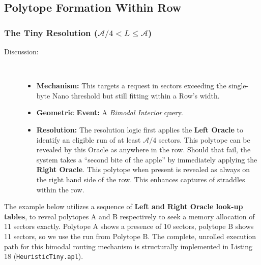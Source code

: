 \documentclass[11pt]{article}
\begin{document}
\subsection{Polytope Formation Within Row}

\subsubsection{The Tiny Resolution ($\mathcal{A}/4 < L \le \mathcal{A}$)}

\begin{description}
\item[Discussion:] \hfill \\
\begin{itemize}
    \item \textbf{Mechanism:} This targets a request in sectors exceeding the single-byte Nano threshold but still fitting within a Row's width.
    
    \item \textbf{Geometric Event:} A \textit{Bimodal Interior} query.
    
    \item \textbf{Resolution:} The resolution logic first applies the \textbf{Left Oracle} to identify an eligible run of at least  $\mathcal{A}/4$ sectors. This polytope can be revealed by this Oracle as anywhere in the row. Should that fail, the system takes a ``second bite of the apple'' by immediately applying the \textbf{Right Oracle}. This polytope when present is revealed as always on the right hand side of the row. This enhances captures of straddles within the row.
\end{itemize}
\end{description}

The example below utilizes a sequence of \textbf{Left and Right Oracle look-up tables}, to reveal polytopes A and B respectively to seek a memory allocation of 11 sectors exactly. Polytope A shows a presence of 10 sectors, polytope B shows 11 sectors, so we use the run from Polytope B. The complete, unrolled execution path for this bimodal routing mechanism is structurally implemented in Listing 18 (\texttt{HeuristicTiny.apl}).
\end{document}
